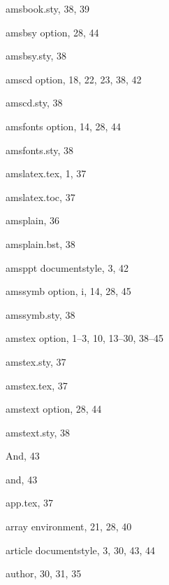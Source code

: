 \begin{theindex}
  \item {\ptt {}amsbook.sty}, 38, 39
  \item {\ptt {}amsbsy} option, 28, 44
  \item {\ptt {}amsbsy.sty}, 38
  \item {\ptt {}amscd} option, 18, 22, 23, 38, 42
  \item {\ptt {}amscd.sty}, 38
  \item {\ptt {}amsfonts} option, 14, 28, 44
  \item {\ptt {}amsfonts.sty}, 38
  \item {\ptt {}amslatex.tex}, 1, 37
  \item {\ptt {}amslatex.toc}, 37
  \item {\ptt {}amsplain}, 36
  \item {\ptt {}amsplain.bst}, 38
  \item {\ptt {}amsppt} documentstyle, 3, 42
  \item {\ptt {}amssymb} option, i, 14, 28, 45
  \item {\ptt {}amssymb.sty}, 38
  \item {\ptt {}amstex} option, 1--3, 10, 13--30, 38--45
  \item {\ptt {}amstex.sty}, 37
  \item {\ptt {}amstex.tex}, 37
  \item {\ptt {}amstext} option, 28, 44
  \item {\ptt {}amstext.sty}, 38
  \item {\ptt \bslash And}, 43
  \item {\ptt \bslash and}, 43
  \item {\ptt {}app.tex}, 37
  \item {\ptt {}array} environment, 21, 28, 40
  \item {\ptt {}article} documentstyle, 3, 30, 43, 44
  \item {\ptt \bslash author}, 30, 31, 35

  \indexspace


\end{theindex}
